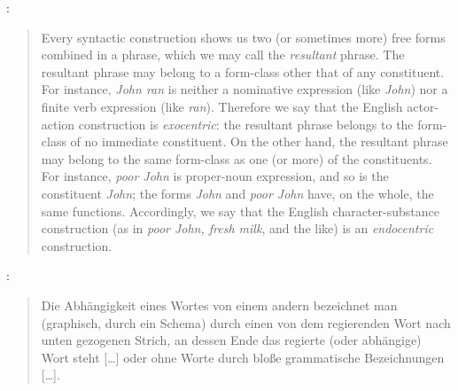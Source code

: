 {    \noindent\citet[section 12.10]{bloomfield1933language} :

    \begin{quote}
    Every syntactic construction shows us two (or sometimes more) free forms combined in a phrase, which we may call the \textit{resultant} phrase. The resultant phrase may belong to a form-class other that of any constituent. For instance, \textit{John ran} is neither a nominative expression (like \textit{John}) nor a finite verb expression (like \textit{ran}). Therefore we say that the English actor-action construction is \textit{exocentric}: the resultant phrase belongs to the form-class of no immediate constituent. On the other hand, the resultant phrase may belong to the same form-class as one (or more) of the constituents. For instance, \textit{poor John} is proper-noun expression, and so is the constituent \textit{John}; the forms \textit{John} and \textit{poor John} have, on the whole, the same functions. Accordingly, we say that the English character-substance construction (as in \textit{poor John, fresh milk}, and the like) is an \textit{endocentric} construction.
    \end{quote}


    \noindent\citet[10]{kern1883zur} :

    \begin{quote}
    Die Abhängigkeit eines Wortes von einem andern bezeichnet man (graphisch, durch ein Schema) durch einen von dem regierenden Wort nach unten gezogenen Strich, an dessen Ende das regierte (oder abhängige) Wort steht […] oder ohne Worte durch bloße grammatische Bezeichnungen […].
    \end{quote}
}
